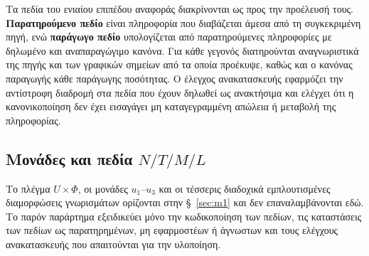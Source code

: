 \documentclass[11pt,a4paper]{article}
\begin{document}
Τα πεδία του ενιαίου επιπέδου αναφοράς διακρίνονται ως προς την προέλευσή τους. \textbf{Παρατηρούμενο πεδίο} είναι πληροφορία που διαβάζεται άμεσα από τη συγκεκριμένη πηγή, ενώ \textbf{παράγωγο πεδίο} υπολογίζεται από παρατηρούμενες πληροφορίες με δηλωμένο και αναπαραγώγιμο κανόνα. Για κάθε γεγονός διατηρούνται αναγνωριστικά της πηγής και των γραφικών σημείων από τα οποία προέκυψε, καθώς και ο κανόνας παραγωγής κάθε παράγωγης ποσότητας. Ο έλεγχος ανακατασκευής εφαρμόζει την αντίστροφη διαδρομή στα πεδία που έχουν δηλωθεί ως ανακτήσιμα και ελέγχει ότι η κανονικοποίηση δεν έχει εισαγάγει μη καταγεγραμμένη απώλεια ή μεταβολή της πληροφορίας.

\subsection{\texorpdfstring{Μονάδες και πεδία \(N/T/M/L\)}{Μονάδες και πεδία N/T/M/L}}\label{app:repr-fields}

Το πλέγμα $U\times\Phi$, οι μονάδες $u_1$--$u_3$ και οι τέσσερις διαδοχικά εμπλουτισμένες διαμορφώσεις γνωρισμάτων ορίζονται στην §~\ref{sec:m1} και δεν επαναλαμβάνονται εδώ. Το παρόν παράρτημα εξειδικεύει μόνο την κωδικοποίηση των πεδίων, τις καταστάσεις των πεδίων ως παρατηρημένων, μη εφαρμοστέων ή άγνωστων και τους ελέγχους ανακατασκευής που απαιτούνται για την υλοποίηση.
\end{document}
